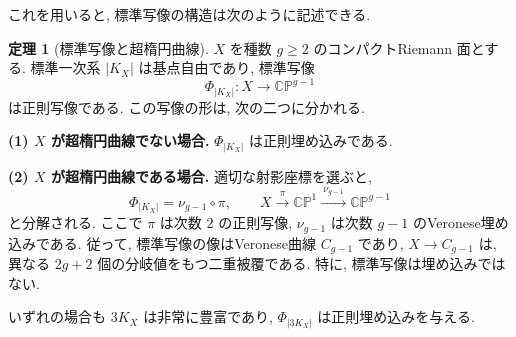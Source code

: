 \documentclass[dvipdfmx,a4paper,11pt]{article} %
\newcommand{\C}{\mathbb{C}}
\theoremstyle{definition}
\newtheorem{thm}{定理}[section]
\numberwithin{equation}{section}
\begin{document}
これを用いると, 標準写像の構造は次のように記述できる.

\begin{thm}[標準写像と超楕円曲線]\label{O-M365}
$X$ を種数 $g\geq2$ のコンパクトRiemann 面とする.
標準一次系 $|K_X|$ は基点自由であり,
標準写像
\[
\Phi_{|K_X|}:X\longrightarrow\C\mathbb P^{g-1}
\]
は正則写像である.
この写像の形は, 次の二つに分かれる.

\medskip
\noindent
\textbf{(1) $X$ が超楕円曲線でない場合.}
$\Phi_{|K_X|}$ は正則埋め込みである.

\medskip
\noindent
\textbf{(2) $X$ が超楕円曲線である場合.}
適切な射影座標を選ぶと,
\[
\Phi_{|K_X|}=\nu_{g-1}\circ\pi,\qquad
X\xrightarrow{\ \pi\ }\C\mathbb P^1
\xrightarrow{\ \nu_{g-1}\ }\C\mathbb P^{g-1}
\]
と分解される.
ここで $\pi$ は次数 $2$ の正則写像,
$\nu_{g-1}$ は次数 $g-1$ のVeronese埋め込みである.
従って, 標準写像の像はVeronese曲線 $C_{g-1}$ であり,
$X\to C_{g-1}$ は, 異なる $2g+2$ 個の分岐値をもつ二重被覆である.
特に, 標準写像は埋め込みではない.

\medskip
いずれの場合も $3K_X$ は非常に豊富であり,
$\Phi_{|3K_X|}$ は正則埋め込みを与える.
\end{thm}
\end{document}
